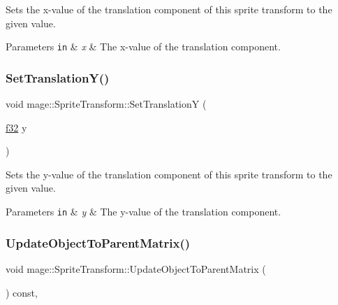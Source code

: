 Sets the x-\/value of the translation component of this sprite transform to the given value.


\begin{DoxyParams}[1]{Parameters}
\mbox{\tt in}  & {\em x} & The x-\/value of the translation component. \\
\hline
\end{DoxyParams}
\hypertarget{structmage_1_1_sprite_transform_ab9a473790dda739c113478dc417e5d9a}{}\label{structmage_1_1_sprite_transform_ab9a473790dda739c113478dc417e5d9a} 
\subsubsection{\texorpdfstring{Set\+Translation\+Y()}{SetTranslationY()}}
{\footnotesize\ttfamily void mage\+::\+Sprite\+Transform\+::\+Set\+TranslationY (\begin{DoxyParamCaption}\item[{\hyperlink{namespacemage_a6a44ad388483959dc4dff9f2aef91431}{f32}}]{y }\end{DoxyParamCaption})\hspace{0.3cm}{\ttfamily [noexcept]}}

Sets the y-\/value of the translation component of this sprite transform to the given value.


\begin{DoxyParams}[1]{Parameters}
\mbox{\tt in}  & {\em y} & The y-\/value of the translation component. \\
\hline
\end{DoxyParams}
\hypertarget{structmage_1_1_sprite_transform_a92ae51f7dbf034d119625f70aa7fad1c}{}\label{structmage_1_1_sprite_transform_a92ae51f7dbf034d119625f70aa7fad1c} 
\subsubsection{\texorpdfstring{Update\+Object\+To\+Parent\+Matrix()}{UpdateObjectToParentMatrix()}}
{\footnotesize\ttfamily void mage\+::\+Sprite\+Transform\+::\+Update\+Object\+To\+Parent\+Matrix (\begin{DoxyParamCaption}{ }\end{DoxyParamCaption}) const\hspace{0.3cm}{\ttfamily [private]}, {\ttfamily [noexcept]}}

